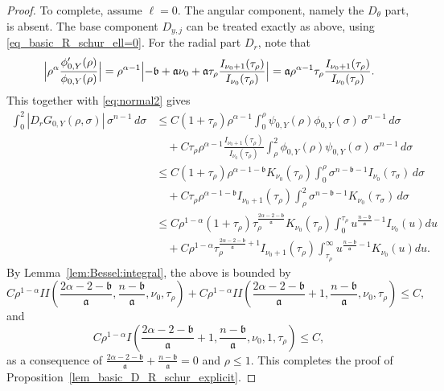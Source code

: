 \documentclass[12pt]{amsart}
\begin{document}
\begin{proof}
To complete, assume $\ell=0$. The angular component, namely the $D_\theta$ part, is absent. The base component $D_{y,j}$ can be treated exactly as above, using \eqref{eq_basic_R_schur_ell=0}. For the radial part $D_r$, note that
\begin{align*}
\Bigl|\rho^\alpha\frac{\phi_{0,Y}'(\rho)}{\phi_{0,Y}(\rho)}\Bigr|
=\rho^{\alpha-1}\Bigl|-\mathfrak b+\mathfrak a\nu_0 + \mathfrak a \tau_\rho \frac{I_{\nu_0+1}(\tau_\rho)}{I_{\nu_0}(\tau_\rho)}\Bigr|= \mathfrak a \rho^{\alpha-1} \tau_\rho \frac{I_{\nu_0+1}(\tau_\rho)}{I_{\nu_0}(\tau_\rho)}.
\end{align*}
This together with \eqref{eq:normal2} gives
\begin{align*}
    \int_0^2
        |D_r G_{0,Y}(\rho,\sigma)|
    \, \sigma^{n-1} \, d\sigma &\le C (1+\tau_\rho) \rho^{\alpha-1} \int_0^\rho \psi_{0,Y}(\rho) \phi_{0,Y}(\sigma) \, \sigma^{n-1} \, d\sigma\\
    &\quad + C \tau_\rho \rho^{\alpha-1} \frac{I_{\nu_0+1}(\tau_\rho)}{I_{\nu_0}(\tau_\rho)}  \int_\rho^2 \phi_{0,Y}(\rho) \psi_{0,Y}(\sigma) \, \sigma^{n-1} \, d\sigma\\
    &\le C (1+\tau_\rho) \rho^{\alpha-1-\mathfrak b} K_{\nu_0}(\tau_\rho) \int_0^\rho \sigma^{n-\mathfrak b-1} I_{\nu_0}(\tau_\sigma) \, d\sigma\\
    &\quad + C \tau_\rho \rho^{\alpha-1-\mathfrak b} I_{\nu_0+1}(\tau_\rho)  \int_\rho^2 \sigma^{n-\mathfrak b-1} K_{\nu_0}(\tau_\sigma) \, d\sigma\\
    &\le  C \rho^{1-\alpha} (1+\tau_\rho) \tau_\rho^{\frac{2\alpha-2-\mathfrak b}{\mathfrak a}} K_{\nu_0}(\tau_\rho) \int_0^{\tau_\rho} u^{\frac{n-\mathfrak b}{\mathfrak a}-1} I_{\nu_0}(u) du\\
    &\quad + C \rho^{1-\alpha} \tau_\rho^{\frac{2\alpha-2-\mathfrak b}{\mathfrak a}+1} I_{\nu_0+1}(\tau_\rho) \int_{\tau_\rho}^\infty u^{\frac{n-\mathfrak b}{\mathfrak a}-1} K_{\nu_0}(u) du.
\end{align*}
By Lemma~\ref{lem:Bessel:integral}, the above is bounded by 
\begin{equation*}
    C \rho^{1-\alpha} II \left(\frac{2\alpha-2-\mathfrak b}{\mathfrak a},\frac{n-\mathfrak b}{\mathfrak a},\nu_0,\tau_\rho \right) +  C \rho^{1-\alpha} II \left(\frac{2\alpha-2-\mathfrak b}{\mathfrak a}+1,\frac{n-\mathfrak b}{\mathfrak a},\nu_0,\tau_\rho \right)\le C,
\end{equation*}
and
\begin{equation*}
   C \rho^{1-\alpha} I\left(\frac{2\alpha-2-\mathfrak b}{\mathfrak a}+1, \frac{n-\mathfrak b}{\mathfrak a},\nu_0, 1, \tau_\rho\right) \le C,
\end{equation*}
as a consequence of $\frac{2\alpha-2-\mathfrak b}{\mathfrak a}+ \frac{n-\mathfrak b}{\mathfrak a}=0$ and $\rho\le 1$. This completes the proof of Proposition~\ref{lem_basic_D_R_schur_explicit}.


\end{proof}
\end{document}
